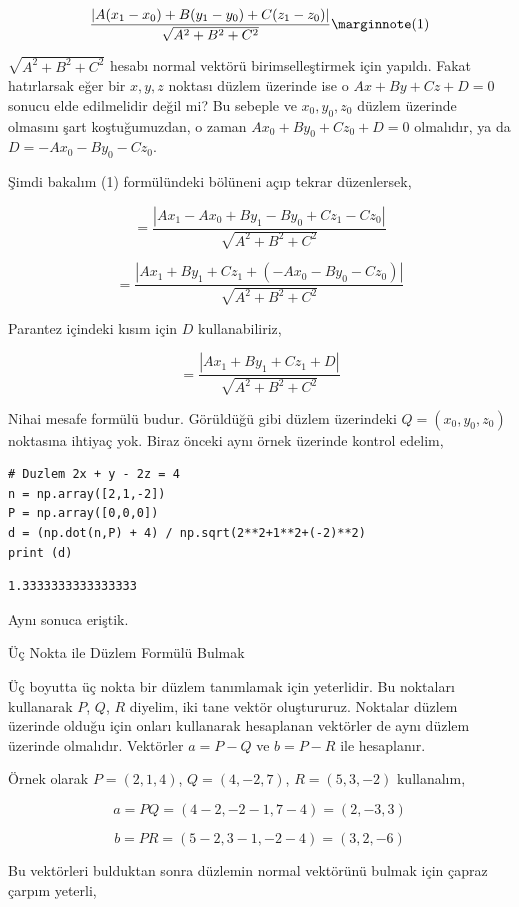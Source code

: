 \documentclass[12pt,fleqn]{article}\usepackage{../../common}
\begin{document}
$$
\frac{ | A(x_1-x_0) + B(y_1-y_0) + C(z_1-z_0) | }{ \sqrt{ A^2 + B^2 + C^2 } }
\mlabel{1}
$$

$\sqrt{ A^2 + B^2 + C^2 }$ hesabı normal vektörü birimselleştirmek için yapıldı.
Fakat hatırlarsak eğer bir $x,y,z$ noktası düzlem üzerinde ise o $Ax+By+Cz+D=0$
sonucu elde edilmelidir değil mi? Bu sebeple ve $x_0,y_0,z_0$ düzlem üzerinde
olmasını şart koştuğumuzdan, o zaman $Ax_0+By_0+Cz_0+D=0$ olmalıdır,
ya da $D = -Ax_0-By_0-Cz_0$.

Şimdi bakalım (1) formülündeki bölüneni açıp tekrar düzenlersek,

$$
= \frac{ | Ax_1 - Ax_0 + By_1 - By_0 + Cz_1 - Cz_0 | }{ \sqrt{ A^2 + B^2 + C^2 } }
$$

$$
= \frac{ | Ax_1 + By_1 + Cz_1 + (-Ax_0 - By_0 - Cz_0) | }{ \sqrt{ A^2 + B^2 + C^2 } }
$$

Parantez içindeki kısım için $D$ kullanabiliriz,

$$
= \frac{ | Ax_1 + By_1 + Cz_1 + D | }{ \sqrt{ A^2 + B^2 + C^2 } }
$$

Nihai mesafe formülü budur. Görüldüğü gibi düzlem üzerindeki $Q=(x_0,y_0,z_0)$
noktasına ihtiyaç yok. Biraz önceki aynı örnek üzerinde kontrol edelim,

\begin{verbatim}
# Duzlem 2x + y - 2z = 4
n = np.array([2,1,-2])
P = np.array([0,0,0])
d = (np.dot(n,P) + 4) / np.sqrt(2**2+1**2+(-2)**2)
print (d)
\end{verbatim}

\begin{verbatim}
1.3333333333333333
\end{verbatim}

Aynı sonuca eriştik.

Üç Nokta ile Düzlem Formülü Bulmak

Üç boyutta üç nokta bir düzlem tanımlamak için yeterlidir. Bu noktaları
kullanarak $P$, $Q$, $R$ diyelim, iki tane vektör oluştururuz. Noktalar düzlem
üzerinde olduğu için onları kullanarak hesaplanan vektörler de aynı düzlem
üzerinde olmalıdır. Vektörler $a = P-Q$ ve $b = P-R$ ile hesaplanır.

Örnek olarak $P = (2,1,4)$, $Q = (4,-2,7)$, $R = (5,3,-2)$ kullanalım,

$$
a = PQ = (4-2, -2-1, 7-4) = (2,-3,3)
$$

$$
b = PR = (5-2, 3-1, -2-4) = (3,2,-6)
$$

Bu vektörleri bulduktan sonra düzlemin normal vektörünü bulmak için çapraz
çarpım yeterli,
\end{document}
